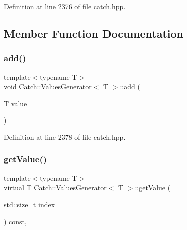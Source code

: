 Definition at line 2376 of file catch.\+hpp.



\subsection{Member Function Documentation}
\hypertarget{class_catch_1_1_values_generator_a8412c8ce5d9d4fc6ff06d5246d56d538}{}\label{class_catch_1_1_values_generator_a8412c8ce5d9d4fc6ff06d5246d56d538} 
\subsubsection{\texorpdfstring{add()}{add()}}
{\footnotesize\ttfamily template$<$typename T$>$ \\
void \hyperlink{class_catch_1_1_values_generator}{Catch\+::\+Values\+Generator}$<$ T $>$\+::add (\begin{DoxyParamCaption}\item[{T}]{value }\end{DoxyParamCaption})\hspace{0.3cm}{\ttfamily [inline]}}



Definition at line 2378 of file catch.\+hpp.

\hypertarget{class_catch_1_1_values_generator_a9674c8b70d562d2d68154de92dd1810a}{}\label{class_catch_1_1_values_generator_a9674c8b70d562d2d68154de92dd1810a} 
\subsubsection{\texorpdfstring{get\+Value()}{getValue()}}
{\footnotesize\ttfamily template$<$typename T$>$ \\
virtual T \hyperlink{class_catch_1_1_values_generator}{Catch\+::\+Values\+Generator}$<$ T $>$\+::get\+Value (\begin{DoxyParamCaption}\item[{std\+::size\+\_\+t}]{index }\end{DoxyParamCaption}) const\hspace{0.3cm}{\ttfamily [inline]}, {\ttfamily [virtual]}}



